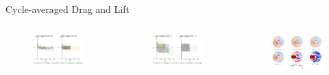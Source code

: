 \documentclass[aspectratio=169,xcolor=dvipsnames]{beamer}
\begin{document}

\begin{frame}{Cycle-averaged Drag and Lift}
    \begin{columns}[c]
        \begin{figure}
            \includegraphics[width=.8\textwidth]{figures/mvmean0p5.pdf}
        \end{figure}
        \begin{figure}
            \includegraphics[width=.8\textwidth]{figures/mvmean1p5.pdf}
        \end{figure}
        \begin{figure}
            \includegraphics[width=.6\textwidth]{figures/pres_0p5.png}
        \end{figure}

\end{columns}
\end{frame}
\end{document}
